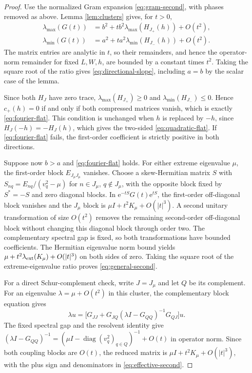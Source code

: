 \documentclass[10pt,twoside,final]{siamart1116}
\numberwithin{equation}{section}
\numberwithin{theorem}{section}
\newcommand{\diag}{\operatorname{diag}}
\newcommand{\e}{\mathrm e}
\begin{document}
\begin{proof}
Use the normalized Gram expansion \eqref{eq:gram-second}, with phases
removed as above. Lemma \ref{lem:clusters} gives, for $t>0$,
\begin{align*}
\lambda_{\max}(G(t))&=b^2+t b^2\lambda_{\max}(H_{J_+}(h))+O(t^2),\\
\lambda_{\min}(G(t))&=a^2+t a^2\lambda_{\min}(H_{J_-}(h))+O(t^2).
\end{align*}
The matrix entries are analytic in $t$, so their remainders, and hence the
operator-norm remainder for fixed $L,W,h$, are bounded by a constant times $t^2$.
Taking the square root of the ratio gives \eqref{eq:directional-slope}, including
$a=b$ by the scalar case of the lemma.

Since both $H_J$ have zero trace, $\lambda_{\max}(H_{J_+})\ge0$ and
$\lambda_{\min}(H_{J_-})\le0$. Hence $c_+(h)=0$ if and only if both compressed matrices
vanish, which is exactly \eqref{eq:fourier-flat}. This condition is unchanged when $h$
is replaced by $-h$, since $H_J(-h)=-H_J(h)$, which gives the two-sided
\eqref{eq:quadratic-flat}. If \eqref{eq:fourier-flat} fails, the first-order
coefficient is strictly positive in both directions.

Suppose now $b>a$ and \eqref{eq:fourier-flat} holds. For either extreme
eigenvalue $\mu$, the first-order block $E_{J_\mu J_\mu}$ vanishes.
Choose a skew-Hermitian matrix $S$ with
$S_{nq}=E_{nq}/(v_q^2-\mu)$ for $n\in J_\mu$, $q\notin J_\mu$,
with the opposite block fixed by $S^*=-S$ and zero diagonal blocks.
In $\e^{-tS}G(t)\e^{tS}$, the first-order off-diagonal block vanishes and the
$J_\mu$ block is $\mu I+t^2K_\mu+O(|t|^3)$. A second unitary transformation
of size $O(t^2)$ removes the remaining second-order off-diagonal block without
changing this diagonal block through order two. The complementary spectral gap
is fixed, so both transformations have bounded coefficients. The Hermitian
eigenvalue norm bound yields $\mu+t^2\lambda_{\rm ext}(K_\mu)+O(|t|^3)$
on both sides of zero. Taking the square root of the extreme-eigenvalue ratio
proves \eqref{eq:general-second}.

For a direct Schur-complement check, write $J=J_\mu$ and let $Q$ be its
complement. For an eigenvalue $\lambda=\mu+O(t^2)$ in this cluster, the
complementary block equation gives
\[
\lambda u=\bigl[G_{JJ}+G_{JQ}(\lambda I-G_{QQ})^{-1}G_{QJ}\bigr]u.
\]
The fixed spectral gap and the resolvent identity give
$(\lambda I-G_{QQ})^{-1}=(\mu I-\diag(v_q^2)_{q\in Q})^{-1}+O(t)$
in operator norm. Since both coupling blocks are $O(t)$, the reduced matrix is
$\mu I+t^2K_\mu+O(|t|^3)$, with the plus sign and denominators in
\eqref{eq:effective-second}.


\end{proof}
\end{document}
